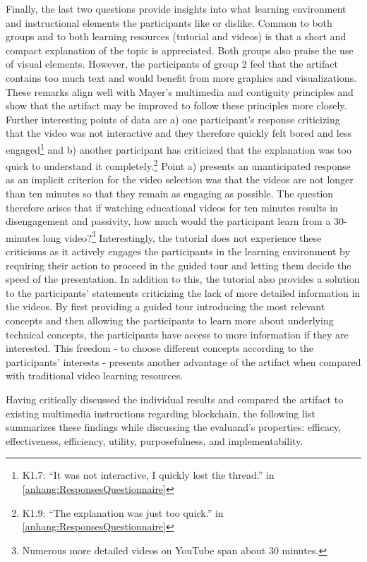 Finally, the last two questions provide insights into what learning environment and instructional elements the participants like or dislike. Common to both groups and to both learning resources (tutorial and videos) is that a short and compact explanation of the topic is appreciated. Both groups also praise the use of visual elements. However, the participants of group 2 feel that the artifact contains too much text and would benefit from more graphics and visualizations. These remarks align well with Mayer's multimedia and contiguity principles and show that the artifact may be improved to follow these principles more closely. Further interesting points of data are a) one participant's response criticizing that the video was not interactive and they therefore quickly felt bored and less engaged\footnote{K1.7: \enquote{It was not interactive, I quickly lost the thread.} in \ref{anhang:ResponsesQuestionnaire}} and b) another participant has criticized that the explanation was too quick to understand it completely.\footnote{K1.9: \enquote{The explanation was just too quick.} in \ref{anhang:ResponsesQuestionnaire}} Point a) presents an unanticipated response as an implicit criterion for the video selection was that the videos are not longer than ten minutes so that they remain as engaging as possible. The question therefore arises that if watching educational videos for ten minutes results in disengagement and passivity, how much would the participant learn from a 30-minutes long video?\footnote{Numerous more detailed videos on YouTube span about 30 minutes.} Interestingly, the tutorial does not experience these criticisms as it actively engages the participants in the learning environment by requiring their action to proceed in the guided tour and letting them decide the speed of the presentation. In addition to this, the tutorial also provides a solution to the participants' statements criticizing the lack of more detailed information in the videos. By first providing a guided tour introducing the most relevant concepts and then allowing the participants to learn more about underlying technical concepts, the participants have access to more information if they are interested. This freedom - to choose different concepts according to the participants' interests - presents another advantage of the artifact when compared with traditional video learning resources.

Having critically discussed the individual results and compared the artifact to existing multimedia instructions regarding blockchain, the following list summarizes these findings while discussing the evaluand's properties: efficacy, effectiveness, efficiency, utility, purposefulness, and implementability.

